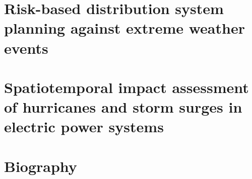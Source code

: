 \documentclass[hidelinks, 12pt]{article}
\begin{document}




\section{Risk-based distribution system planning against extreme weather events} 

\newpage


\clearpage
\section{Spatiotemporal impact assessment of hurricanes and storm surges in electric power systems}


\clearpage



\newpage
\section{Biography}


\newpage



\end{document}
